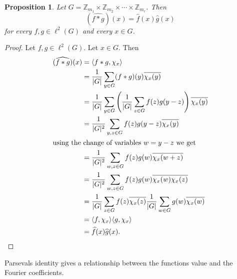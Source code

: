 \documentclass[12pt]{article}
\newtheorem{Proposition}{Proposition}
\newcommand{\Z}{\mathbb{Z}}
\newcommand{\Zm}{\Z_{m_1}\times \Z_{m_2} \times \cdots \times \Z_{m_r}}
\begin{document}
\begin{Proposition} \label{convolution = pointwise mult}%
    Let $G = \Zm$.
    Then
    \[
        (\widehat{f * g})(x) = \widehat{f}(x)\widehat{g}(x)
    \]
    for every $f, g\in \ell^2(G)$ and every $x\in G$.
\end{Proposition}
\begin{proof}
    Let $f, g\in \ell^2(G)$.
    Let $x\in G$.
    Then
    \begin{align*}
        (\widehat{f*g})(x)
          & = \langle f * g, \chi_x \rangle                                                                          \\
          & = \frac{1}{|G|}\sum_{y\in G} (f*g)(y)\overline{\chi_x(y)}                                                \\
          & = \frac{1}{|G|}\sum_{y \in G} \left( \frac{1}{|G|} \sum_{z\in G} f(z)g(y-z) \right) \overline{\chi_x(y)} \\
          & = \frac{1}{|G|^2} \sum_{y,z\in G} f(z)g(y-z)\overline{\chi_x(y)}                                         \\
        \intertext{using the change of variables $w=y-z$ we get}
          & = \frac{1}{|G|^2} \sum_{w,z\in G} f(z)g(w)\overline{\chi_x(w+z)}                                         \\
          & = \frac{1}{|G|^2} \sum_{w,z\in G} f(z)g(w)\overline{\chi_x(w)}\overline{\chi_x(z)}                       \\
          & = \frac{1}{|G|}\sum_{z\in G}f(z)\overline{\chi_x(z)}\frac{1}{|G|}\sum_{w\in G}g(w)\overline{\chi_x(w)}   \\
          & = \langle f, \chi_x \rangle \langle g, \chi_x \rangle                                                    \\
          & =\widehat{f}(x)\widehat{g}(x).
    \end{align*}
\end{proof}

Parsevals identity gives a relationship between the functions value and the Fourier coefficients.
\end{document}
